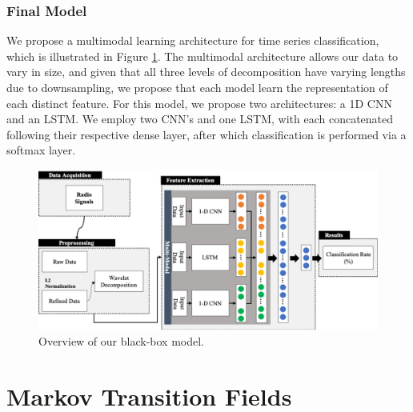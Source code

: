 \documentclass{turabian-thesis}
\begin{document}
\subsection{Final Model}

We propose a multimodal learning architecture for time series classification, which is illustrated in Figure \ref{fig:multimodal_overview}. The multimodal architecture allows our data to vary in size, and given that all three levels of decomposition have varying lengths due to downsampling, we propose that each model learn the representation of each distinct feature. For this model, we propose two architectures: a 1D CNN and an LSTM. We employ two CNN’s and one LSTM, with each concatenated following their respective dense layer, after which classification is performed via a softmax layer. 

\begin{figure}[h!]
   \begin{center}
      \includegraphics[scale=0.6]{../media/multimodal_overview.png}
   \end{center}
   \caption{Overview of our black-box model.}
   \label{fig:multimodal_overview}
\end{figure}






 
\chapter{Markov Transition Fields}
\label{chap:mtf}
\end{document}
